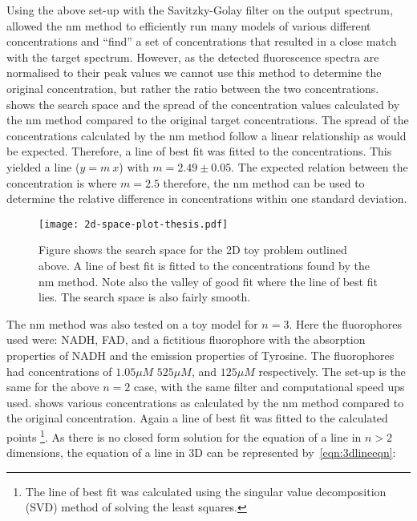 Using the above set-up with the Savitzky-Golay filter on the output spectrum, allowed the \gls*{nm} method to efficiently run many models of various different concentrations and ``find'' a set of concentrations that resulted in a close match with the target spectrum.
However, as the detected fluorescence spectra are normalised to their peak values we cannot use this method to determine the original concentration, but rather the ratio between the two concentrations.
 shows the search space and the spread of the concentration values calculated by the \gls*{nm} method compared to the original target concentrations.
The spread of the concentrations calculated by the \gls*{nm} method follow a linear relationship as would be expected.
Therefore, a line of best fit was fitted to the concentrations.
This yielded a line ($y=m\ x$) with $m=2.49\pm0.05$.
The expected relation between the concentration is where $m =2.5$ therefore, the \gls*{nm} method can be used to determine the relative difference in concentrations within one standard deviation.


\begin{figure}[!htpb]
  \centering
  \texttt{[image: 2d-space-plot-thesis.pdf]}
  \caption{Figure shows the search space for the 2D toy problem outlined above. A line of best fit is fitted to the concentrations found by the \gls*{nm} method. Note also the valley of good fit where the line of best fit lies. The search space is also fairly smooth.}
  \label{fig:spaceplot2D}

\end{figure}


The \gls*{nm} method was also tested on a toy model for $n=3$.
Here the fluorophores used were: NADH, FAD, and a fictitious fluorophore with the absorption properties of NADH and the emission properties of Tyrosine.
The fluorophores had concentrations of $1.05\mu M$ $525\mu M$, and $125\mu M$ respectively.
The set-up is the same for the above $n=2$ case, with the same filter and computational speed ups used.
 shows various concentrations as calculated by the \gls*{nm} method compared to the original concentration.
Again a line of best fit was fitted to the calculated points \footnote{The line of best fit was calculated using the singular value decomposition (SVD) method of solving the least squares.}.
As there is no closed form solution for the equation of a line in $n>2$ dimensions, the equation of a line in 3D can be represented by~\cref{eqn:3dlineeqn}:

